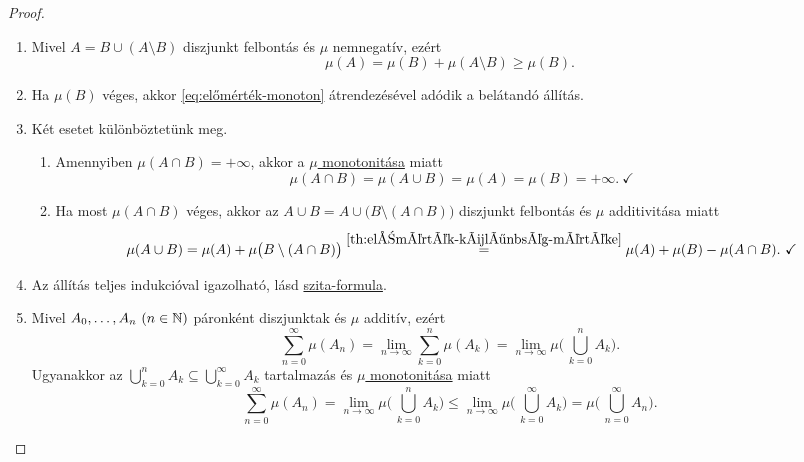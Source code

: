 \documentclass[
]{elteikthesis}[2024/04/26]
\begin{document}
	\begin{proof}\,
		\begin{enumerate}
			\item Mivel \( A = B \cup (A \setminus B) \) diszjunkt felbontás és \( \mu \) nemnegatív, ezért
			\[
				\mu(A) = \mu(B) + \mu(A \setminus B) \geq \mu(B). 
				\tag{\( * \)}\label{eq:előmérték-monoton}
			\]
			
			\item Ha \( \mu(B) \) véges, akkor \eqref{eq:előmérték-monoton} átrendezésével adódik a belátandó állítás.
			
			\item Két esetet különböztetünk meg.
			\begin{enumerate}
				\item 
				Amennyiben \( \mu(A \cap B) = +\infty \), 
				akkor a \hyperref[th:előmérték-monoton]{\( \mu \) monotonitása} miatt
				\[
					\mu(A \cap B) = \mu(A \cup B) = \mu(A) = \mu(B) = +\infty.\ \checkmark
				\]
				
				\item Ha most \( \mu(A \cap B) \) véges, 
				akkor az \( A \cup B = A \cup \bigl( B \setminus (A \cap B) \bigr) \) diszjunkt felbontás és \( \mu \) additivitása miatt
				\[
					\mu(A \cup B) = 
					\mu(A) + \mu \bigl( B \setminus (A \cap B) \bigr) \overset{\ref{th:előmérték-különbség-mértéke}}{=} 
					\mu(A) + \mu(B) - \mu( A \cap B).\ \checkmark
				\]
			\end{enumerate}
			
			\item Az állítás teljes indukcióval igazolható, 
			lásd \hyperref[th:előmérték-szita-formula]{szita-formula}.
			
			\item Mivel \( A_0, \dots, A_n \ (n \in \mathbb{N}) \) páronként diszjunktak 
			és \( \mu \) additív, ezért
			\[
				\sum_{n=0}^{\infty} \mu( A_n ) =
				\lim_{n \to \infty} \sum_{k=0}^{n} \mu( A_k ) =
				\lim_{n \to \infty} \mu \Biggl( \, \bigcup_{k=0}^n \! A_k \Biggr).
			\]
			Ugyanakkor az
			\( \bigcup\limits_{k=0}^n \! A_k \subseteq \bigcup\limits_{k=0}^{\infty} \! A_k \)
			tartalmazás és \hyperref[th:előmérték-monoton]{\( \mu \) monotonitása} miatt
			\[
				\sum_{n=0}^{\infty} \mu( A_n ) =
				\lim_{n \to \infty} \mu \Biggl( \, \bigcup_{k=0}^n \! A_k \Biggr) \leq
				\lim_{n \to \infty} \mu \Biggl( \, \bigcup_{k=0}^{\infty} \! A_k \Biggr) =
				\mu \Biggl( \, \bigcup_{n=0}^{\infty} \! A_n \Biggr).
			\]
		\end{enumerate}
	\end{proof}
	
\end{document}
